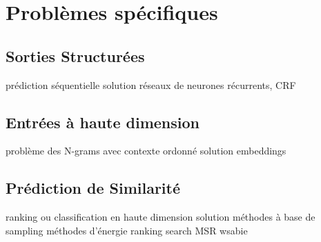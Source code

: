 \section{Problèmes spécifiques}
\subsection{Sorties Structurées}

prédiction séquentielle
solution réseaux de neurones récurrents, CRF

\subsection{Entrées à haute dimension}

problème des N-grams avec contexte ordonné
solution embeddings

\subsection{Prédiction de Similarité}

ranking ou classification en haute dimension
solution méthodes à base de sampling
méthodes d'énergie ranking
search MSR
wsabie

